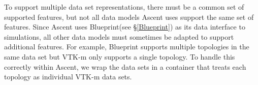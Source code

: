 To support multiple data set representations, there must be a common
set of supported features, but not all data models Ascent uses
support the same set of features.
%
Since Ascent uses Blueprint(see \S\ref{Blueprint}) as its data interface to simulations,
all other data models must sometimes be adapted to support additional
features.
%
For example, Blueprint supports multiple topologies in the same data set
but VTK-m only supports a single topology.
%
To handle this correctly within Ascent, we wrap the data sets in a container
that treats each topology as individual VTK-m data sets.
%

